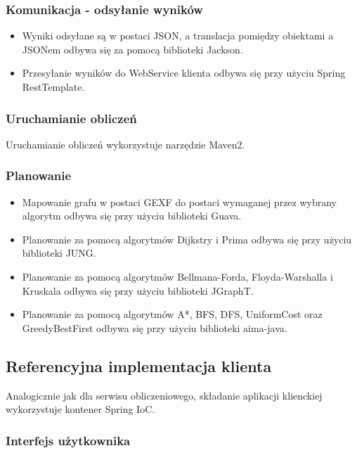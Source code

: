 \subsubsection{Komunikacja - odsyłanie wyników}

\begin{itemize}
	\item Wyniki odsyłane są w postaci JSON, a translacja pomiędzy obiektami a JSONem odbywa się za pomocą biblioteki Jackson.
	\item Przesyłanie wyników do WebService klienta odbywa się przy użyciu Spring RestTemplate.
\end{itemize}

\subsubsection{Uruchamianie obliczeń}

Uruchamianie obliczeń wykorzystuje narzędzie Maven2.

\subsubsection{Planowanie}

\begin{itemize}
	\item Mapowanie grafu w postaci GEXF do postaci wymaganej przez wybrany algorytm odbywa się przy użyciu biblioteki Guava.
	\item Planowanie za pomocą algorytmów Dijkstry i Prima odbywa się przy użyciu biblioteki JUNG.
	\item Planowanie za pomocą algorytmów Bellmana-Forda, Floyda-Warshalla i Kruskala odbywa się przy użyciu biblioteki JGraphT.
	\item Planowanie za pomocą algorytmów A*, BFS, DFS, UniformCost oraz GreedyBestFirst odbywa się przy użyciu biblioteki aima-java.
\end{itemize}

\subsection{Referencyjna implementacja klienta}

Analogicznie jak dla serwisu obliczeniowego, składanie aplikacji klienckiej wykorzystuje kontener Spring IoC.

\subsubsection{Interfejs użytkownika}

